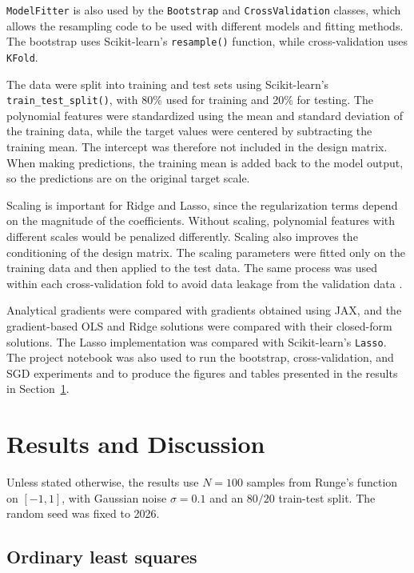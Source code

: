 \documentclass[amssymb,twocolumn,aps]{revtex4}
\begin{document}
\texttt{ModelFitter} is also used by the \texttt{Bootstrap} and \texttt{CrossValidation} classes, which allows the resampling code to be used with different models and fitting methods. The bootstrap uses Scikit-learn's \texttt{resample()} function, while cross-validation uses \texttt{KFold}.

The data were split into training and test sets using Scikit-learn's \texttt{train\_test\_split()}, with 80\% used for training and 20\% for testing. The polynomial features were standardized using the mean and standard deviation of the training data, while the target values were centered by subtracting the training mean. The intercept was therefore not included in the design matrix. When making predictions, the training mean is added back to the model output, so the predictions are on the original target scale.

Scaling is important for Ridge and Lasso, since the regularization terms depend on the magnitude of the coefficients. Without scaling, polynomial features with different scales would be penalized differently. Scaling also improves the conditioning of the design matrix. The scaling parameters were fitted only on the training data and then applied to the test data. The same process was used within each cross-validation fold to avoid data leakage from the validation data \cite{lecturebook}.

Analytical gradients were compared with gradients obtained using JAX, and the gradient-based OLS and Ridge solutions were compared with their closed-form solutions. The Lasso implementation was compared with Scikit-learn's \texttt{Lasso}. The project notebook was also used to run the bootstrap, cross-validation, and SGD experiments and to produce the figures and tables presented in the results in Section~\ref{section:results}.

\section{Results and Discussion}\label{section:results}

Unless stated otherwise, the results use $N=100$ samples from Runge's function on $[-1,1]$, with Gaussian noise $\sigma=0.1$ and an $80/20$ train-test split. The random seed was fixed to 2026.

\subsection{Ordinary least squares}
\end{document}
